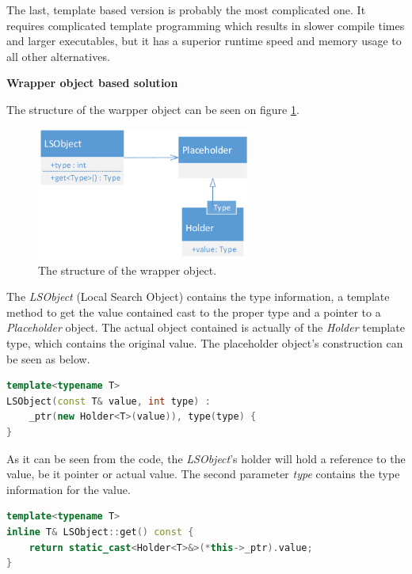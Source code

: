 The last, template based version is probably the most complicated one. It
requires complicated template programming which results in slower compile times
and larger executables, but it has a superior runtime speed and memory usage to
all other alternatives.

\textbf{Wrapper object based solution}

 The structure of the warpper object can be seen on figure
 \ref{fig:wrapper_structure}.

\begin{figure}[!ht]
\centering
\includegraphics[width=70mm, keepaspectratio]{figures/wrapper_structure.png}
\caption{The structure of the wrapper object.}
\label{fig:wrapper_structure}
\end{figure}

The \emph{LSObject} (Local Search Object) contains the type information, a
template method to get the value contained cast to the proper type and a pointer to a
\emph{Placeholder} object. The actual object contained is actually of the
\emph{Holder} template type, which contains the original value. The placeholder
object's construction can be seen as below.

\begin{lstlisting}[frame=single,float=!ht,language=C++, caption=Constructing a
wrapper object.] template<typename T>
LSObject(const T& value, int type) :
	_ptr(new Holder<T>(value)), type(type) {
}
\end{lstlisting}

As it can be seen from the code, the \emph{LSObject}'s holder will hold a
reference to the value, be it pointer or actual value. The second parameter
\emph{type} contains the type information for the value. 

\begin{lstlisting}[frame=single,float=!ht,language=C++, caption=Retrieving
correctly typed object.]
template<typename T>
inline T& LSObject::get() const {
    return static_cast<Holder<T>&>(*this->_ptr).value;
}
\end{lstlisting}


